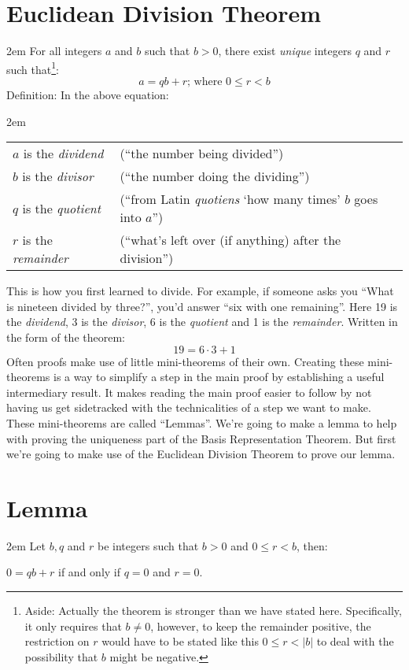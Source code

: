 \documentclass{article}
\newenvironment{jprIn}{\begin{adjustwidth}{2em}{}}{\end{adjustwidth}}
\begin{document}
\section*{Euclidean Division Theorem}
\begin{jprIn}
For all integers $a$ and $b$ such that $b>0$,
there exist \emph{unique} integers $q$ and $r$ such that\footnote{Aside:
Actually the theorem is stronger than we have stated here.
Specifically, it only requires that $b\ne0$, however,
to keep the remainder positive, the restriction on $r$
would have to be stated like
this $0\le{}r<\left|b\right|$ to deal with
the possibility that $b$ might be negative.}:
\[a=qb+r  \text{; where } 0\le{}r<b\]
Definition: In the above equation:
\begin{jprIn}
\begin{tabular}{l l}
\(a\) is the \emph{dividend} & (``the number being divided'')\\
\(b\) is the \emph{divisor} & (``the number doing the dividing'')\\
\(q\) is the \emph{quotient} & (``from Latin \emph{quotiens} `how many times' \(b\) goes into \(a\)'')\\
\(r\) is the \emph{remainder} & (``what's left over (if anything) after the division'')
\end{tabular}
\end{jprIn}
\end{jprIn}
This is how you first learned to divide.
For example, if someone asks you ``What is nineteen divided by three?'', you'd
answer ``six with one remaining''. Here 19 is the \emph{dividend},  3 is the \emph{divisor},
6 is the \emph{quotient} and 1 is the \emph{remainder}. Written in the form of the theorem:
\[19=6\cdot3+1\]
Often proofs make use of little mini-theorems of their own.
Creating these mini-theorems is a way to simplify a step in
the main proof by establishing a useful
intermediary result. It makes reading the main proof
easier to follow by not having us get sidetracked with
the technicalities of a step we want to make.
These mini-theorems are called ``Lemmas''.
We're going to make a lemma to help with proving the uniqueness part
of the Basis Representation Theorem. But first we're going to make use of the
Euclidean Division Theorem to prove our lemma.

\section*{Lemma}
\begin{jprIn}
Let $b, q$ and $r$ be integers such that $b>0$ and $0\le{}r<b$, then:
\begin{center}
$0=qb+r$ 
\hspace{1.5em}if and only if\hspace{1.5em}
$q=0$ and $r=0$.
\end{center}
\end{jprIn}
\end{document}
